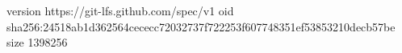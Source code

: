 version https://git-lfs.github.com/spec/v1
oid sha256:24518ab1d362564cececc72032737f722253f607748351ef53853210decb57be
size 1398256

